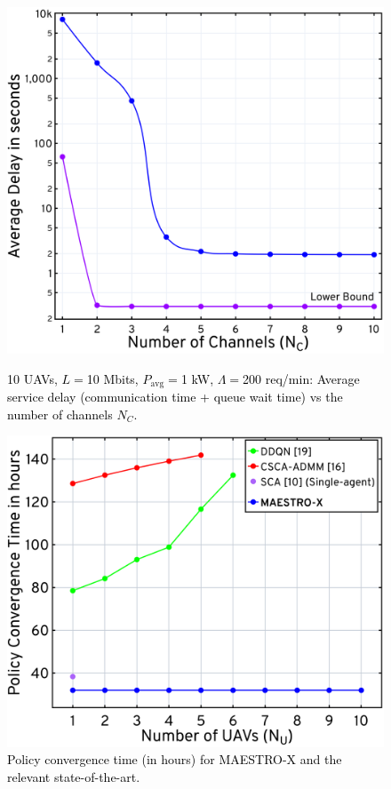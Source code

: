\documentclass[12pt, draftcls, onecolumn]{IEEEtran}
\theoremstyle{plain}
\theoremstyle{definition}
\theoremstyle{remark}
\newcommand\hlt[1]{\textcolor{black}{#1}}
\begin{document}
\begin{figure}[t]
	\begin{minipage}[b]{0.47\linewidth}
	\centering
	\includegraphics[width=0.95\linewidth]{figs/Delay_NC_10_UAVs.jpg}
    \vspace{-2mm}
	\caption{\hlt{10 UAVs, $L{=}$10 Mbits, $P_{\mathrm{avg}}{=}$1 kW, $\Lambda{=}$200 req/min: Average service delay (communication time + queue wait time) vs the number of channels $N_{C}$.}}
	\label{F10a}
\end{minipage}
\hfill
\begin{minipage}[b]{0.485\linewidth}
	\centering
	\includegraphics[width=1.0\linewidth]{figs/Policy_Convergence.jpg}
    \vspace{-2mm}
	\caption{\hlt{Policy convergence time (in hours) for MAESTRO-X and the relevant state-of-the-art.}}
	\label{F10}
\end{minipage}
\end{figure}
\vspace{-4mm}
\end{document}
